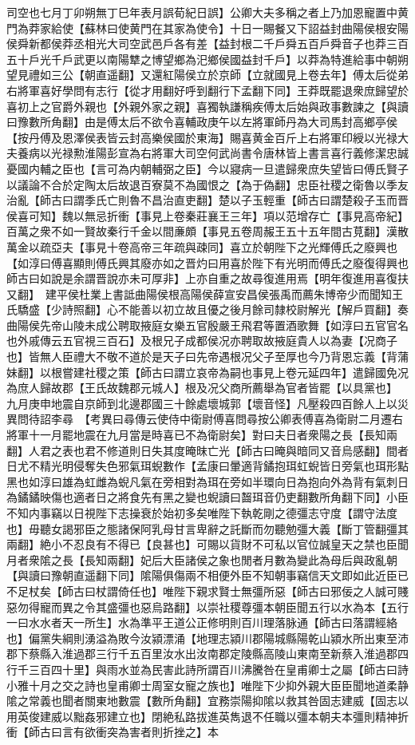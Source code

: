 司空也七月丁卯朔無丁巳年表月誤荀紀日誤】公卿大夫多稱之者上乃加恩寵置中黄門為莽家給使【蘇林曰使黄門在其家為使令】十日一賜餐又下詔益封曲陽侯根安陽侯舜新都侯莽丞相光大司空武邑戶各有差【益封根二千戶舜五百戶舜音子也莽三百五十戶光千戶武更以南陽犨之博望鄉為汜鄉侯國益封千戶】以莽為特進給事中朝朔望見禮如三公【朝直遥翻】又還紅陽侯立於京師【立就國見上卷去年】傅太后從弟右將軍喜好學問有志行【從才用翻好呼到翻行下孟翻下同】王莽既罷退衆庶歸望於喜初上之官爵外親也【外親外家之親】喜獨執謙稱疾傅太后始與政事數諫之【與讀曰豫數所角翻】由是傅太后不欲令喜輔政庚午以左將軍師丹為大司馬封高鄉亭侯【按丹傅及恩澤侯表皆云封高樂侯國於東海】賜喜黄金百斤上右將軍印綬以光禄大夫養病以光禄勲淮陽彭宣為右將軍大司空何武尚書令唐林皆上書言喜行義修潔忠誠憂國内輔之臣也【言可為内朝輔弼之臣】今以寢病一旦遣歸衆庶失望皆曰傅氏賢子以議論不合於定陶太后故退百寮莫不為國恨之【為于偽翻】忠臣社稷之衛魯以季友治亂【師古曰謂季氏亡則魯不昌治直吏翻】楚以子玉輕重【師古曰謂楚殺子玉而晋侯喜可知】魏以無忌折衝【事見上卷秦莊襄王三年】項以范增存亡【事見高帝紀】百萬之衆不如一賢故秦行千金以間亷頗【事見五卷周赧王五十五年間古莧翻】漢散萬金以疏亞夫【事見十卷高帝三年疏與疎同】喜立於朝陛下之光輝傅氏之廢興也【如淳曰傅喜顯則傅氏興其廢亦如之晋灼曰用喜於陛下有光明而傅氏之廢復得興也師古曰如說是余謂晋說亦未可厚非】上亦自重之故尋復進用焉【明年復進用喜復扶又翻】　建平侯杜業上書詆曲陽侯根高陽侯薛宣安昌侯張禹而薦朱博帝少而聞知王氏驕盛【少詩照翻】心不能善以初立故且優之後月餘司隸校尉解光【解戶買翻】奏曲陽侯先帝山陵未成公聘取掖庭女樂五官殷嚴王飛君等置酒歌舞【如淳曰五官官名也外戚傳云五官視三百石】及根兄子成都侯况亦聘取故掖庭貴人以為妻【况商子也】皆無人臣禮大不敬不道於是天子曰先帝遇根况父子至厚也今乃背恩忘義【背蒲妹翻】以根嘗建社稷之策【師古曰謂立哀帝為嗣也事見上卷元延四年】遣歸國免况為庶人歸故郡【王氏故魏郡元城人】根及况父商所薦舉為官者皆罷【以具黨也】　九月庚申地震自京師到北邊郡國三十餘處壞城郭【壞音怪】凡壓殺四百餘人上以災異問待詔李尋　【考異曰尋傳云使侍中衛尉傅喜問尋按公卿表傅喜為衛尉二月遷右將軍十一月罷地震在九月當是時喜已不為衛尉矣】對曰夫日者衆陽之長【長知兩翻】人君之表也君不修道則日失其度晻昩亡光【師古曰晻與暗同又音烏感翻】間者日尤不精光明侵奪失色邪氣珥蜺數作【孟康曰暈適背鐍抱珥虹蜺皆日旁氣也珥形點黑也如淳曰雄為虹雌為蜺凡氣在旁相對為珥在旁如半環向日為抱向外為背有氣刺日為鐍鐍映傷也適者日之將食先有黑之變也蜺讀曰齧珥音仍吏翻數所角翻下同】小臣不知内事竊以日視陛下志操衰於始初多矣唯陛下執乾剛之德彊志守度【謂守法度也】毋聽女謁邪臣之態諸保阿乳母甘言卑辭之託斷而勿聽勉彊大義【斷丁管翻彊其兩翻】絶小不忍良有不得已【良甚也】可賜以貨財不可私以官位誠皇天之禁也臣聞月者衆隂之長【長知兩翻】妃后大臣諸侯之象也閒者月數為變此為母后與政亂朝【與讀曰豫朝直遥翻下同】隂陽俱傷兩不相便外臣不知朝事竊信天文即如此近臣已不足杖矣【師古曰杖謂倚任也】唯陛下親求賢士無彊所惡【師古曰邪佞之人誠可賤惡勿得寵而異之令其盛彊也惡烏路翻】以崇社稷尊彊本朝臣聞五行以水為本【五行一曰水水者天一所生】水為準平王道公正修明則百川理落脉通【師古曰落謂經絡也】偏黨失綱則湧溢為敗今汝潁漂涌【地理志潁川郡陽城縣陽乾山潁水所出東至沛郡下蔡縣入淮過郡三行千五百里汝水出汝南郡定陵縣高陵山東南至新蔡入淮過郡四行千三百四十里】與雨水並為民害此詩所謂百川沸騰咎在皇甫卿士之屬【師古曰詩小雅十月之交之詩也皇甫卿士周室女寵之族也】唯陛下少抑外親大臣臣聞地道柔静隂之常義也聞者關東地數震【數所角翻】宜務崇陽抑隂以救其咎固志建威【固志以用英俊建威以黜姦邪建立也】閉絶私路拔進英雋退不任職以彊本朝夫本彊則精神折衝【師古曰言有欲衝突為害者則折挫之】本